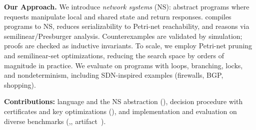 \smallskip
\noindent
\textbf{Our Approach.}
We introduce \textit{network systems} (NS): abstract programs where requests manipulate local and shared state and return responses. \toolname{} compiles programs to NS, reduces serializability to Petri-net reachability, and reasons via semilinear/Presburger analysis. Counterexamples are validated by simulation; proofs are checked as inductive invariants. To scale, we employ Petri-net pruning and semilinear-set optimizations, reducing the search space by orders of magnitude in practice. We evaluate on programs with loops, branching, locks, and nondeterminism, including SDN-inspired examples (firewalls, BGP, shopping).


\smallskip
\noindent
\textbf{Contributions:}
\toolname{} language and the NS abstraction (),
decision procedure with certificates and key optimizations (), and
implementation and evaluation on diverse benchmarks (,, artifact~\cite{ArtifactRepository}).
